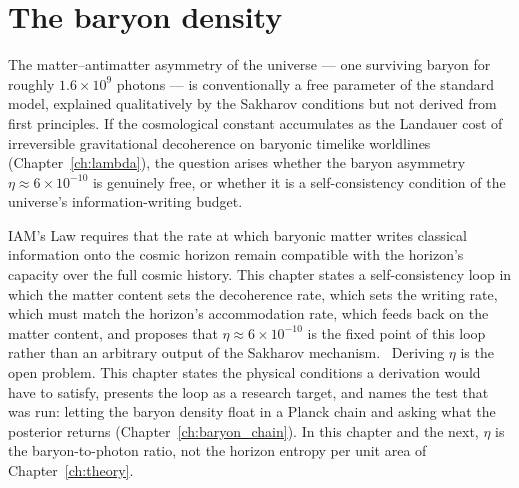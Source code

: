 \chapter{The baryon density}\label{ch:baryon}

The matter--antimatter asymmetry of the universe --- one surviving baryon for roughly $1.6\times10^9$ photons --- is conventionally a
free parameter of the standard model, explained qualitatively by the Sakharov conditions but not derived from first principles. If the
cosmological constant accumulates as the Landauer cost of irreversible gravitational decoherence on baryonic timelike worldlines
(Chapter~\ref{ch:lambda}), the question arises whether the baryon asymmetry $\eta\approx6\times10^{-10}$ is genuinely free, or whether
it is a self-consistency condition of the universe's information-writing budget.

IAM's Law requires that the rate at which baryonic matter writes classical information onto the cosmic horizon remain compatible
with the horizon's capacity over the full cosmic history. This chapter states a self-consistency loop in which the matter content sets
the decoherence rate, which sets the writing rate, which must match the horizon's accommodation rate, which feeds back on the matter
content, and proposes that $\eta\approx6\times10^{-10}$ is the fixed point of this loop rather than an arbitrary output of the Sakharov
mechanism. \conjecture\ Deriving $\eta$ is the open problem. This chapter states the physical conditions a derivation would have to satisfy, presents the loop as a research target, and names the test that was run: letting the baryon density float in a Planck chain and asking what the posterior returns (Chapter~\ref{ch:baryon_chain}). In this chapter and the next, $\eta$ is the baryon-to-photon ratio, not the horizon
entropy per unit area of Chapter~\ref{ch:theory}.

